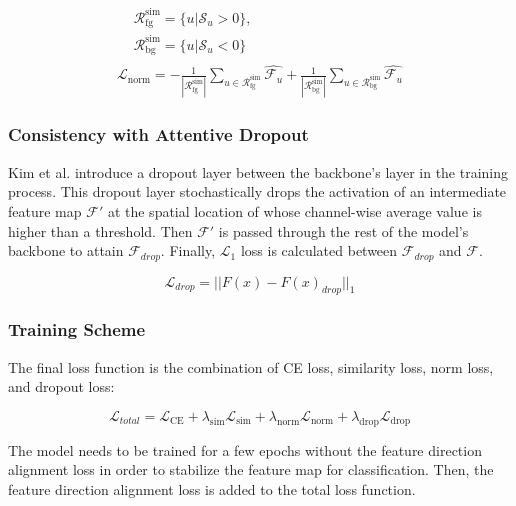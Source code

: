 \documentclass[conference]{IEEEtran}
\begin{document}
\begin{gather} \label{eq:norm loss}
    \begin{aligned}
         & \mathcal{R}_{\text{fg}}^{\text{sim}} = \{u|\mathcal{S}_u>0\}, & \\
         & \mathcal{R}_{\text{bg}}^{\text{sim}} = \{u|\mathcal{S}_u<0\}  &
    \end{aligned} \\
    \mathcal{L}_{\text{norm}} = -\frac{1}{|\mathcal{R}_{\text{fg}}^{\text{sim}}|}\sum_{u\in\mathcal{R}_{\text{fg}}^{\text{sim}}}{\hat{\mathcal{F}_u}} + \frac{1}{|\mathcal{R}_{\text{bg}}^{\text{sim}}|}\sum_{u\in\mathcal{R}_{\text{bg}}^{\text{sim}}}{\hat{\mathcal{F}_u}}
\end{gather}


\subsubsection{Consistency with Attentive Dropout}
Kim et al. \cite{kim2022bridging} introduce a dropout layer between the backbone's layer in the training process. This dropout layer stochastically drops the activation of an intermediate feature map $\mathcal{F}'$ at the spatial location of whose channel-wise average value is higher than a threshold. Then $\mathcal{F}'$ is passed through the rest of the model's backbone to attain $\mathcal{F}_{drop}$. Finally, $\mathcal{L}_1$ loss is calculated between $\mathcal{F}_{drop}$ and $\mathcal{F}$.

\begin{equation} \label{eq:drop loss}
    \mathcal{L}_{drop} = ||F(x) - F(x)_{drop}||_1
\end{equation}

\subsubsection{Training Scheme}
The final loss function is the combination of CE loss, similarity loss, norm loss, and dropout loss:

\begin{equation} \label{eq:total loss}
    \mathcal{L}_{total} = \mathcal{L}_{\text{CE}} + \lambda_{\text{sim}}\mathcal{L}_{\text{sim}} + \lambda_{\text{norm}}\mathcal{L}_{\text{norm}} + \lambda_{\text{drop}}\mathcal{L}_{\text{drop}}
\end{equation}

The model needs to be trained for a few epochs without the feature direction alignment loss in order to stabilize the feature map for classification. Then, the feature direction alignment loss is added to the total loss function.
\end{document}
